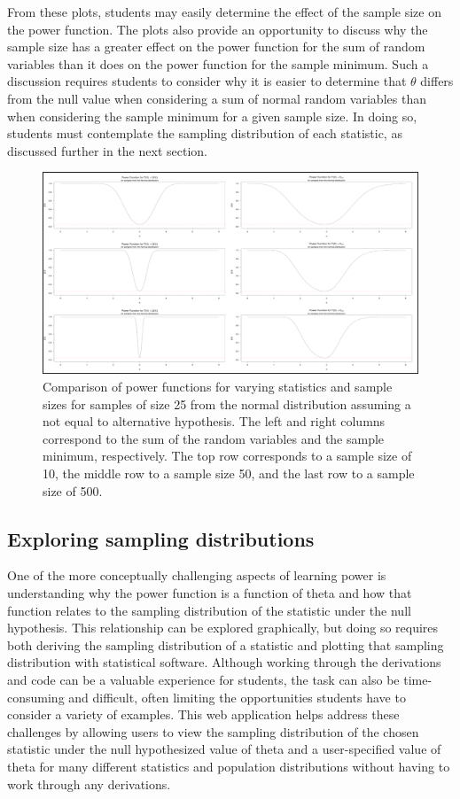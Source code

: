 \documentclass{TISE}
\begin{document}
From these plots, students may easily determine the effect of the sample size on the power function. The plots also provide an opportunity to discuss why the sample size has a greater effect on the power function for the sum of random variables than it does on the power function for the sample minimum. Such a discussion requires students to consider why it is easier to determine that $\theta$ differs from the null value when considering a sum of normal random variables than when considering the sample minimum for a given sample size. In doing so, students must contemplate the sampling distribution of each statistic, as discussed further in the next section.

\begin{figure}[H]
	\centering
	\includegraphics[width=\linewidth]{varyingn.png}
	\caption{Comparison of power functions for varying statistics and sample sizes for samples of size 25 from the normal distribution assuming a not equal to alternative hypothesis. The left and right columns correspond to the sum of the random variables and the sample minimum, respectively. The top row corresponds to a sample size of 10, the middle row to a sample size 50, and the last row to a sample size of 500.}
\end{figure}

\subsection{Exploring sampling distributions}

One of the more conceptually challenging aspects of learning power is understanding why the power function is a function of theta and how that function relates to the sampling distribution of the statistic under the null hypothesis. This relationship can be explored graphically, but doing so requires both deriving the sampling distribution of a statistic and plotting that sampling distribution with statistical software. Although working through the derivations and code can be a valuable experience for students, the task can also be time-consuming and difficult, often limiting the opportunities students have to consider a variety of examples. This web application helps address these challenges by allowing users to view the sampling distribution of the chosen statistic under the null hypothesized value of theta and a user-specified value of theta for many different statistics and population distributions without having to work through any derivations. 
\end{document}
